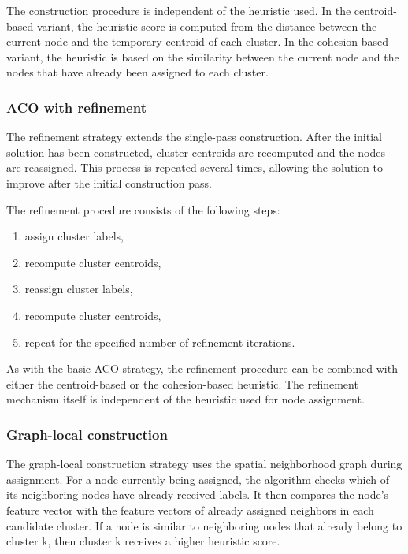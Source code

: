 \documentclass[11pt]{article}
\begin{document}
The construction procedure is independent of the heuristic used. In the centroid-based variant, the heuristic score is computed from the distance between the current node and the temporary centroid of each cluster. In the cohesion-based variant, the heuristic is based on the similarity between the current node and the nodes that have already been assigned to each cluster. 


\subsubsection{ACO with refinement}

The refinement strategy extends the single-pass construction. After the initial solution has been constructed, cluster centroids are recomputed and the nodes are reassigned. This process is repeated several times, allowing the solution to improve after the initial construction pass.

The refinement procedure consists of the following steps:

\begin{enumerate}
    \item assign cluster labels,
    \item recompute cluster centroids,
    \item reassign cluster labels,
    \item recompute cluster centroids,
    \item repeat for the specified number of refinement iterations.
\end{enumerate}

As with the basic ACO strategy, the refinement procedure can be combined with either the centroid-based or the cohesion-based heuristic. The refinement mechanism itself is independent of the heuristic used for node assignment.


\subsubsection{Graph-local construction}
The graph-local construction strategy uses the spatial neighborhood graph during assignment. For a node currently being assigned, the algorithm checks which of its neighboring nodes have already received labels. It then compares the node’s feature vector with the feature vectors of already assigned neighbors in each candidate cluster. If a node is similar to neighboring nodes that already belong to cluster k, then cluster k receives a higher heuristic score.
\end{document}
